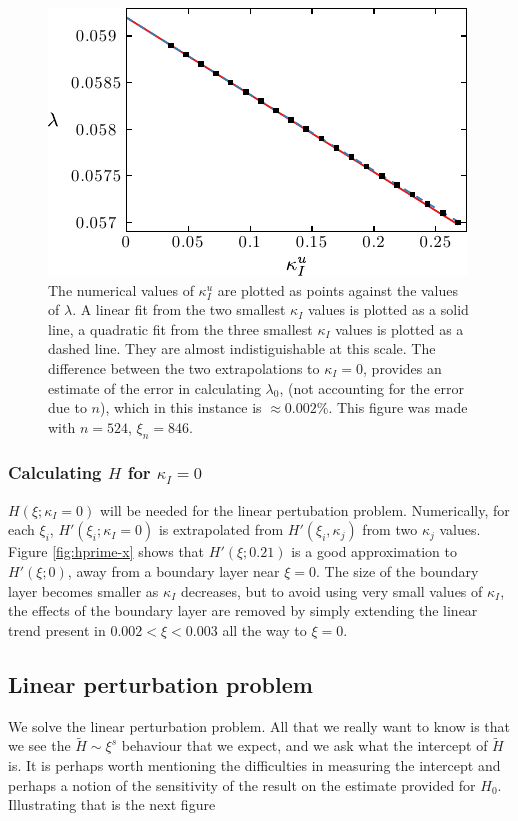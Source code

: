 \documentclass{jfm}
\begin{document}
\begin{figure}
  \centerline{\includegraphics{./../../Graphs/l0-edited.pdf}}
  \caption{The numerical values of $\kappa_I^u$ are plotted as points against
           the values of $\lambda$. A linear fit from the two smallest $\kappa_I$ 
           values is plotted 
           as a solid line, a quadratic fit from the three smallest $\kappa_I$ 
           values is plotted as a dashed line.
           They are almost indistiguishable at this scale. 
           The difference between the two extrapolations to $\kappa_I=0$,  
           provides an estimate of the error in calculating $\lambda_0$, 
           (not accounting for the error due to $n$), which in this instance is 
           $\approx 0.002\%$. This figure was made with $n=524$, $\xi_n=846$. }
\end{figure}
\subsubsection{Calculating $H$ for $\kappa_I =0$}
$H(\xi ; \kappa_I=0)$ will be needed for the linear pertubation problem.
Numerically, for each $\xi_i$, $H'(\xi_i; \kappa_I = 0)$ is extrapolated
from $H'(\xi_i, \kappa_j)$ from two $\kappa_j$ values. Figure 
\ref{fig:hprime-x} shows that $H'(\xi; 0.21)$ 
is a good approximation to $H'(\xi;0)$, away from a boundary 
layer near $\xi=0$. The size of the boundary layer becomes smaller as $\kappa_I$
decreases, but to avoid using very small values of $\kappa_I$, the effects
of the boundary layer are removed by simply extending the linear trend present
in $0.002 < \xi < 0.003$ all the way to $\xi=0$.
\subsection{Linear perturbation problem}
We solve the linear perturbation problem. All that we really want to know
is that we see the $\tilde{H} \sim \xi^{s}$ behaviour that we expect, and we ask what the
intercept of $\tilde{H}$ is. It is perhaps worth mentioning the difficulties
in measuring the intercept and perhaps a notion of the sensitivity of the 
result on the estimate provided for $H_0$. Illustrating that is the next
figure 
\end{document}

